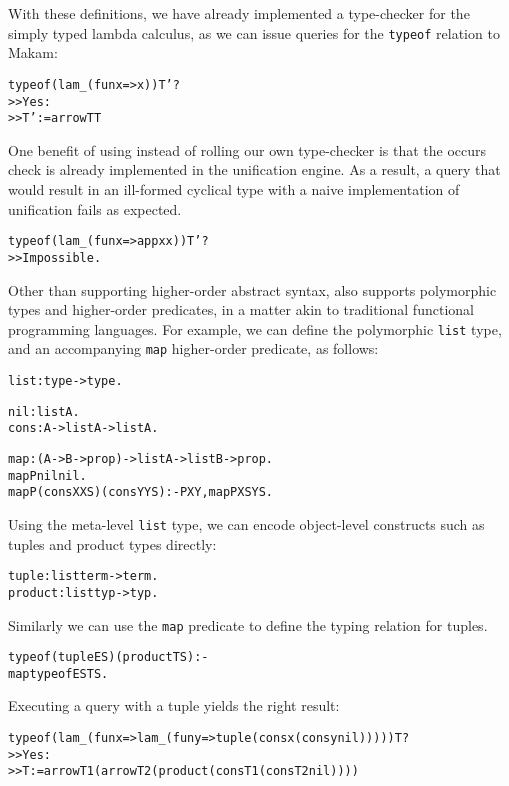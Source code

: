 \documentclass[format=acmlarge,review,anonymous]{acmart}\settopmatter{printfolios=true}
\begin{document}
With these definitions, we have already implemented a type-checker for the simply typed lambda
calculus, as we can issue queries for the \texttt{typeof} relation to Makam:

\begin{alltt}
typeof (lam _ (fun x => x)) T' ?
>> Yes:
>> T' := arrow T T
\end{alltt}

One benefit of using \lamprolog instead of rolling our own type-checker is that the occurs check is
already implemented in the unification engine. As a result, a query that would result in an
ill-formed cyclical type with a naive implementation of unification fails as expected.

\begin{alltt}
typeof (lam _ (fun x => app x x)) T' ?
>> Impossible.
\end{alltt}

Other than supporting higher-order abstract syntax, \lamprolog also supports polymorphic types and
higher-order predicates, in a matter akin to traditional functional programming languages. For
example, we can define the polymorphic \texttt{list} type, and an accompanying \texttt{map}
higher-order predicate, as follows:

\begin{alltt}
list : type -> type.

nil : list A.
cons : A -> list A -> list A.

map : (A -> B -> prop) -> list A -> list B -> prop.
map P nil nil.
map P (cons X XS) (cons Y YS) :- P X Y, map P XS YS.
\end{alltt}

Using the meta-level \texttt{list} type, we can encode object-level constructs such as tuples and product
types directly:

\begin{alltt}
tuple : list term -> term.
product : list typ -> typ.
\end{alltt}

Similarly we can use the \texttt{map} predicate to define the typing relation for tuples. 

\begin{alltt}
typeof (tuple ES) (product TS) :-
  map typeof ES TS.
\end{alltt}

Executing a query with a tuple yields the right result:

\begin{alltt}
typeof (lam _ (fun x => lam _ (fun y => tuple (cons x (cons y nil))))) T ?
>> Yes:
>> T := arrow T1 (arrow T2 (product (cons T1 (cons T2 nil))))
\end{alltt}
\end{document}
